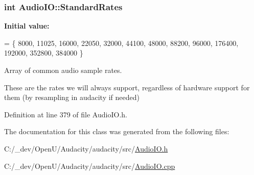 \subsubsection[{\texorpdfstring{Standard\+Rates}{StandardRates}}]{ {\bf int} Audio\+I\+O\+::\+Standard\+Rates\hspace{0.3cm}{\ttfamily [static]}}\hypertarget{class_audio_i_o_a42f4cf4090548388aa1c762bb59778ba}{}\label{class_audio_i_o_a42f4cf4090548388aa1c762bb59778ba}
{\bfseries Initial value\+:}
\begin{DoxyCode}
= \{
   8000,
   11025,
   16000,
   22050,
   32000,
   44100,
   48000,
   88200,
   96000,
   176400,
   192000,
   352800,
   384000
\}
\end{DoxyCode}


Array of common audio sample rates. 

These are the rates we will always support, regardless of hardware support for them (by resampling in audacity if needed) 

Definition at line 379 of file Audio\+I\+O.\+h.



The documentation for this class was generated from the following files\+:\begin{DoxyCompactItemize}
\item 
C\+:/\+\_\+dev/\+Open\+U/\+Audacity/audacity/src/\hyperlink{_audio_i_o_8h}{Audio\+I\+O.\+h}\item 
C\+:/\+\_\+dev/\+Open\+U/\+Audacity/audacity/src/\hyperlink{_audio_i_o_8cpp}{Audio\+I\+O.\+cpp}\end{DoxyCompactItemize}
